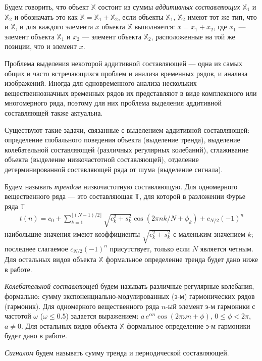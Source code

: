 \documentclass[specialist,
               substylefile = spbu.rtx,
               subf,href,colorlinks=true, 12pt]{disser}
\begin{document}
Будем говорить, что объект $\mathbb{X}$ состоит из суммы \textit{аддитивных составляющих} $\mathbb{X}_1$ и $\mathbb{X}_2$ и обозначать это как $\mathbb{X}=\mathbb{X}_1 + \mathbb{X}_2$, если объекты $\mathbb{X}_1$, $\mathbb{X}_2$ имеют тот же тип, что и $\mathbb{X}$, и для каждого элемента $x$ объекта $\mathbb{X}$ выполняется: $x = x_1 + x_2$, где $x_1$ --- элемент объекта $\mathbb{X}_1$ и $x_2$ --- элемент объекта $\mathbb{X}_2$, расположенные на той же позиции, что и элемент $x$.

Проблема выделения некоторой аддитивной составляющей --- одна из самых общих и часто встречающихся проблем и анализа временных рядов, и анализа изображений. Иногда для одновременного анализа нескольких вещественнозначных временных рядов их представляют в виде комплексного или многомерного ряда, поэтому для них проблема выделения аддитивной составляющей также актуальна.

Существуют такие задачи, связанные с выделением аддитивной составляющей: определение глобального поведения объекта (выделение тренда), выделение колебательной составляющей (различных регулярных колебаний), сглаживание объекта (выделение низкочастотной составляющей), отделение детерминированной составляющей ряда от шума (выделение сигнала).

Будем называть \textit{трендом} низкочастотную составляющую. Для одномерного вещественного ряда --- это составляющая $\mathbb{T}$, для которой в разложении Фурье ряда $\mathbb{T}$
\begin{gather*}
t(n) = c_0 + \sum_{k=1}^{\lfloor (N-1)/2 \rfloor}\sqrt{c_k^2 + s_k^2} \cos(2\pi n k /N + \phi_k) + c_{N/2} (-1)^n
\end{gather*}
 наибольшие значения имеют коэффициенты $\sqrt{c_k^2 + s_k^2}$ с маленьким значением $k$; последнее слагаемое $c_{N/2} (-1)^n$ присутствует, только если $N$ является четным. Для остальных видов объекта $\mathbb{X}$ формальное определение тренда будет дано ниже в работе.

\textit{Колебательной составляющей} будем называть различные регулярные колебания, формально: сумму экспоненциально-модулированных (э-м) гармонических рядов (гармоник).
Для одномерного вещественного ряда $n$-ый элемент э-м гармоники с частотой $\omega$ ($\omega \leqslant
0.5$) задается выражением:
$
a \,e^{\alpha n} \cos(2\pi \omega n  + \phi)
$, $0 \leqslant \phi < 2\pi$, $a \not = 0$.
 Для остальных видов объекта $\mathbb{X}$ формальное определение э-м гармоники будет дано в работе.

\textit{Сигналом} будем называть сумму тренда и периодической составляющей. 
\end{document}
